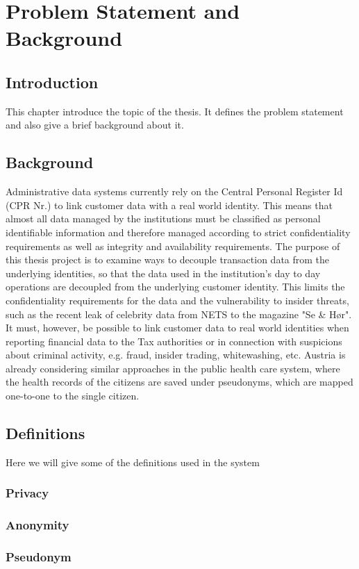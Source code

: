 \chapter{Problem Statement and Background}

\section{Introduction}
This chapter introduce the topic of the thesis. It defines the problem statement and also give a brief background about it.
\section{Background}
Administrative data systems currently rely on the Central Personal Register Id (CPR Nr.) to link customer data with a real world identity. This means that almost all data managed by the institutions must be classified as personal identifiable information and therefore managed according to strict confidentiality requirements as well as integrity and availability requirements. The purpose of this thesis project is to examine ways to decouple transaction data from the underlying identities, so that the data used in the institution's day to day operations are decoupled from the underlying customer identity. This limits the confidentiality requirements for the data and the vulnerability to insider threats, such as the recent leak of celebrity data from NETS to the magazine "Se \& Hør". It must, however, be possible to link customer data to real world identities when reporting financial data to the Tax authorities or in connection with suspicions about criminal activity, e.g. fraud, insider trading, whitewashing, etc. Austria is already considering similar approaches in the public health care system, where the health records of the citizens are saved under pseudonyms, which are mapped one-to-one to the single citizen.
\section{Definitions}
Here we will give some of the definitions used in the system
\subsection{Privacy}
\subsection{Anonymity}
\subsection{Pseudonym}
